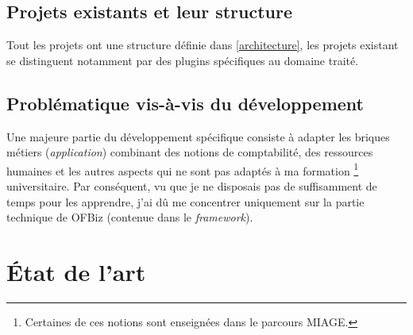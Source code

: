 \subsection{Projets existants et leur structure}
Tout les projets ont une structure définie dans \ref{architecture}, les projets existant se distinguent notamment par des plugins spécifiques au domaine traité. 

\subsection{Problématique vis-à-vis du développement}
\label{probfonctionnel}
Une majeure partie du développement spécifique consiste à adapter les briques métiers (\emph{application}) combinant des notions de comptabilité, des ressources humaines et les autres aspects qui ne sont pas adaptés à ma formation \footnote{Certaines de ces notions sont enseignées dans le parcours MIAGE.} universitaire. Par conséquent, vu que je ne disposais pas de suffisamment de temps pour les apprendre, j'ai dû me concentrer uniquement sur la partie technique de OFBiz (contenue dans le \emph{framework}).















\newpage


\section{État de l'art}

